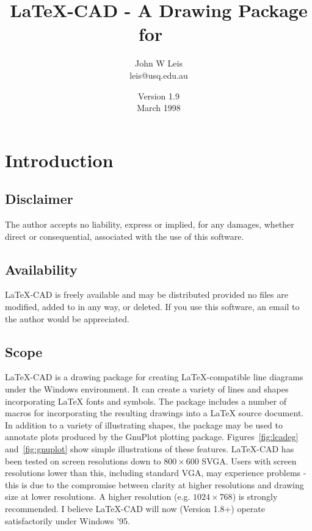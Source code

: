 \documentclass[a4paper]{article}
\begin{document}
\title{ \large\bf  \LaTeX-CAD - A Drawing Package for \LaTeXe\ }
\author{John W Leis \\ leis@usq.edu.au}
\date{Version 1.9 \\ March 1998}
\maketitle

\section{Introduction}


\subsection{Disclaimer}
The author accepts no liability, express or implied, for any 
damages, whether direct or consequential, associated with the
use of this software. 

\subsection{Availability}
LaTeX-CAD is freely available and may be distributed provided
no files are modified, added to in any way, or deleted.
If you use this software, an email to the author would be appreciated.

\subsection{Scope}
LaTeX-CAD is a drawing package for creating \LaTeX-compatible line
diagrams under the Windows environment. It can create a variety of
lines and shapes incorporating \LaTeX\/ fonts and symbols.
The package includes a number of macros for incorporating the
resulting drawings into a \LaTeX\/ source document. In addition to a
variety of illustrating shapes, the package may be used to annotate
plots produced by the GnuPlot plotting package. Figures~\ref{fig:lcadeg}
and~\ref{fig:gnuplot} show simple illustrations of these features.
LaTeX-CAD has been tested on screen resolutions down to $800\times 600$ SVGA.
Users with screen resolutions lower than this, including standard VGA, may
experience problems - this is due to the compromise between clarity at higher
resolutions and drawing size at lower resolutions. A higher resolution
(e.g. $1024\times 768$) is strongly recommended.
I believe LaTeX-CAD will now (Version 1.8+) operate satisfactorily under
Windows '95.
\end{document}
